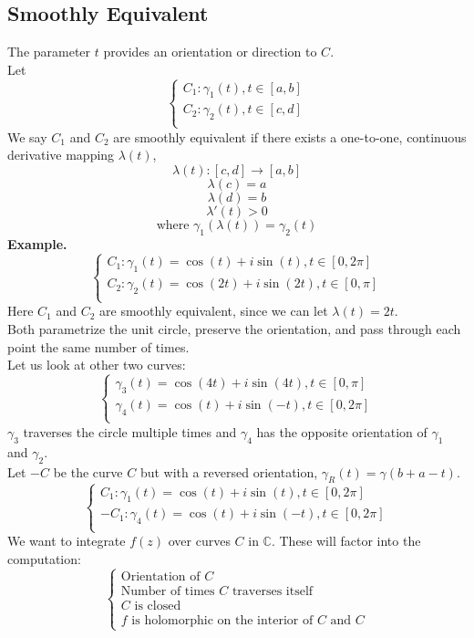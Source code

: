 \documentclass[11pt]{article}
\begin{document}
\subsection{Smoothly Equivalent}
The parameter $t$ provides an orientation or direction to $C$. \\
Let 
\[ \begin{cases} 
	C_1: \gamma_1(t), t \in [a, b] \\
	C_2: \gamma_2(t), t \in [c, d]\\
   \end{cases}
\]
We say $C_1$ and $C_2$ are smoothly equivalent if there exists a one-to-one, continuous derivative mapping $\lambda(t)$, 
$$\lambda(t): [c, d] \to [a, b]$$ 
$$\lambda(c) = a$$
$$\lambda(d) = b$$ 
$$\lambda'(t) > 0$$
\begin{equation*}
\mbox{where } \gamma_1(\lambda(t)) = \gamma_2(t)
\end{equation*}
\textbf{Example.}
\[ \begin{cases} 
	C_1: \gamma_1(t) = \cos(t) + i\sin(t), t \in [0, 2\pi] \\
	C_2: \gamma_2(t) = \cos(2t) + i\sin(2t),  t \in [0, \pi]\\
   \end{cases}
\]
Here $C_1$ and $C_2$ are smoothly equivalent, since we can let $\lambda(t) = 2t$. \\
Both parametrize the unit circle, preserve the orientation, and pass through each point the same number of times. \\
Let us look at other two curves: 
\[ \begin{cases} 
	\gamma_3(t) = \cos(4t) + i\sin(4t), t \in [0, \pi] \\
	\gamma_4(t) = \cos(t) + i\sin(-t),  t \in [0, 2\pi]\\
   \end{cases}
\]
$\gamma_3$ traverses the circle multiple times and $\gamma_4$ has the opposite orientation of $\gamma_1$ and $\gamma_2$. \\
\newline
Let $-C$ be the curve $C$ but with a reversed orientation, $\gamma_{R}(t) = \gamma(b + a -t)$. 
\[ \begin{cases} 
	C_1: \gamma_1(t) = \cos(t) + i\sin(t), t \in [0, 2\pi] \\
	-C_1: \gamma_4(t) = \cos(t) + i\sin(-t),  t \in [0, 2\pi]\\
   \end{cases}
\]
We want to integrate $f(z)$ over curves $C$ in $\mathbb{C}$. These will factor into the computation: 
\[ \begin{cases} 
	\mbox{Orientation of } C\\
	\mbox{Number of times } C \mbox{ traverses itself} \\
	C \mbox{ is closed} \\
	f \mbox{ is holomorphic on the interior of } C \mbox{ and } C
   \end{cases}
\]
\end{document}
